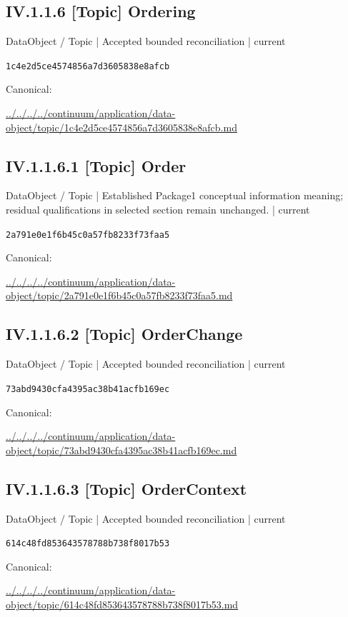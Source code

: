 \documentclass[10pt,a4paper]{article}
\begin{document}
\subsection*{IV.1.1.6 [Topic] Ordering}
{\small DataObject / Topic | Accepted bounded reconciliation | current}\par
\texttt{1c4e2d5ce4574856a7d3605838e8afcb}\par
Canonical: \par
{\footnotesize\url{../../../../continuum/application/data-object/topic/1c4e2d5ce4574856a7d3605838e8afcb.md}}\par
\subsection*{IV.1.1.6.1 [Topic] Order}
{\small DataObject / Topic | Established Package1 conceptual information meaning; residual qualifications in selected section remain unchanged. | current}\par
\texttt{2a791e0e1f6b45c0a57fb8233f73faa5}\par
Canonical: \par
{\footnotesize\url{../../../../continuum/application/data-object/topic/2a791e0e1f6b45c0a57fb8233f73faa5.md}}\par
\subsection*{IV.1.1.6.2 [Topic] OrderChange}
{\small DataObject / Topic | Accepted bounded reconciliation | current}\par
\texttt{73abd9430cfa4395ac38b41acfb169ec}\par
Canonical: \par
{\footnotesize\url{../../../../continuum/application/data-object/topic/73abd9430cfa4395ac38b41acfb169ec.md}}\par
\subsection*{IV.1.1.6.3 [Topic] OrderContext}
{\small DataObject / Topic | Accepted bounded reconciliation | current}\par
\texttt{614c48fd853643578788b738f8017b53}\par
Canonical: \par
{\footnotesize\url{../../../../continuum/application/data-object/topic/614c48fd853643578788b738f8017b53.md}}\par
\end{document}
